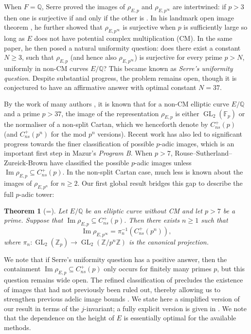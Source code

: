 \documentclass{amsart}
\newcommand{\op}[1]{\operatorname{#1}}
\newtheorem{theorem}{Theorem}
\theoremstyle{definition}
\newcommand{\Z}{\mathbb{Z}}
\newcommand{\Q}{\mathbb{Q}}
\newcommand{\F}{\mathbb{F}}
\newcommand{\GL}{\operatorname{GL}}
\numberwithin{theorem}{section}
\numberwithin{equation}{section}
\begin{document}
When $F=\Q$, Serre proved the images of $\rho_{E,p}$ and $\rho_{E,p^{\infty}}$ are intertwined: if $p>3$ then one is surjective if and only if the other is \cite[IV-23, Lemma 3]{serre-abrep}. In his landmark open image theorem \cite{MR387283}, he further showed that $\rho_{E,p^{\infty}}$ is surjective when $p$ is sufficiently large so long as $E$ does not have potential complex multiplication (CM).  In the same paper, he then posed a natural uniformity question: does there exist a constant $N \geq 3$, such that $\rho_{E,p}$ (and hence also $\rho_{E,p^{\infty}}$) is surjective for every prime $p>N$, uniformly in non-CM curves $E/\Q$? This became known as \textit{Serre's uniformity question}. Despite substantial progress, the problem remains open, though it is conjectured to have an affirmative answer with optimal constant $N=37$.

By the work of many authors \cite{serre81, mazur78, biluparent11, biluparent13, zywina15, lefournlemos21, furiolombardo23}, it is known that for a non-CM elliptic curve $E/\Q$ and a prime $p>37$, the image of the representation $\rho_{E,p}$ is either $\GL_2(\F_p)$ or the normaliser of a non-split Cartan, which we henceforth denote by $C_{ns}^+(p)$ (and $C_{ns}^+(p^n)$ for the mod $p^n$ versions). Recent work has also led to significant progress towards the finer classification of possible $p$-adic images, which is an important first step in Mazur's \textit{Program B}. When $p>7$, Rouse--Sutherland--Zureick-Brown \cite[Theorem 1.1.6]{rszb22} have classified the possible $p$-adic images unless $\op{Im}\rho_{E,p} \subseteq C_{ns}^+(p)$. In the non-split Cartan case, much less is known about the images of $\rho_{E, p^n}$ for $n \geq 2$. Our first global result bridges this gap to describe the full $p$-adic tower:

\begin{theorem}[=]\label{introthm: no sharp groups over Q}
Let $E/\Q$ be an elliptic curve without CM and let $p > 7$ be a prime. Suppose that $\op{Im} \rho_{E, p} \subseteq C_{ns}^+(p)$. Then there exists $n \geq 1$ such that
\[
\op{Im} \rho_{E, p^\infty} = \pi_n^{-1} \left(C_{ns}^+(p^n)\right),
\]
where $\pi_n : \GL_2(\Z_p) \to \GL_2(\Z/p^n\Z)$ is the canonical projection.
\end{theorem}

We note that if Serre's uniformity question has a positive answer, then the containment $\op{Im}\rho_{E,p} \subseteq C_{ns}^+(p)$ only occurs for finitely many primes $p$, but this question remains wide open. 
The refined classification of  precludes the existence of images that had not previously been ruled out, thereby allowing us to strengthen previous adelic image bounds \cite{MR3437765, furio24}. 
We state here a simplified version of our result in terms of the $j$-invariant; a fully explicit version is given in . We note that the dependence on the height of $E$ is essentially optimal for the available methods.
\end{document}

